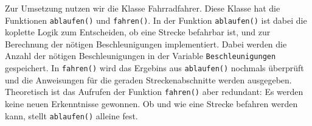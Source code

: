 
	Zur Umsetzung nutzen wir die Klasse Fahrradfahrer.
	Diese Klasse hat die Funktionen \texttt{ablaufen()} und \texttt{fahren()}.
	In der Funktion \texttt{ablaufen()} ist dabei die koplette Logik zum Entscheiden, ob eine Strecke befahrbar ist, und zur Berechnung der nötigen Beschleunigungen implementiert. 
	Dabei werden die Anzahl der nötigen Beschleunigungen in der Variable \texttt{Beschleunigungen} gespeichert.
	In \texttt{fahren()} wird das Ergebins aus \texttt{ablaufen()} nochmals überprüft und die Anweisungen für die geraden Streckenabschnitte werden ausgegeben. 
	Theoretisch ist das Aufrufen der Funktion \texttt{fahren()} aber redundant: Es werden keine neuen Erkenntnisse gewonnen. 
	Ob und wie eine Strecke befahren werden kann, stellt \texttt{ablaufen()} alleine fest.
	
